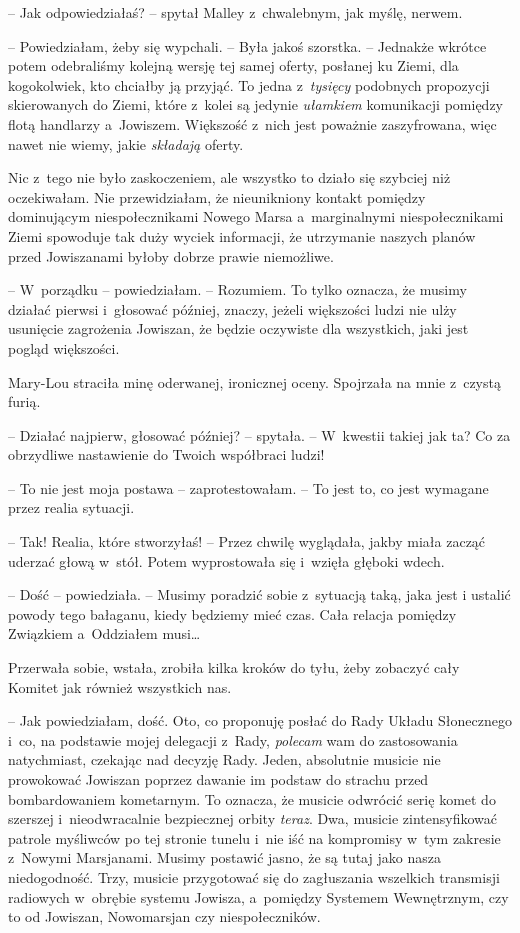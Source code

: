 \documentclass[oneside,polish,11pt,sfheadings]{mwbk}
\begin{document}
-- Jak odpowiedziałaś? -- spytał Malley z~chwalebnym, jak myślę, nerwem.

-- Powiedziałam, żeby się wypchali. -- Była jakoś szorstka. -- Jednakże
wkrótce potem odebraliśmy kolejną wersję tej samej oferty, posłanej ku
Ziemi, dla kogokolwiek, kto chciałby ją przyjąć. To jedna z~\textit{tysięcy} podobnych propozycji skierowanych do Ziemi, które z~kolei
są jedynie \textit{ułamkiem} komunikacji pomiędzy flotą handlarzy a~Jowiszem. Większość z~nich jest poważnie zaszyfrowana, więc nawet nie
wiemy, jakie \textit{składają} oferty.

Nic z~tego nie było zaskoczeniem, ale wszystko to działo się szybciej
niż oczekiwałam. Nie przewidziałam, że nieunikniony kontakt pomiędzy
dominującym niespołecznikami Nowego Marsa a~marginalnymi
niespołecznikami Ziemi spowoduje tak duży wyciek informacji, że
utrzymanie naszych planów przed Jowiszanami byłoby dobrze prawie
niemożliwe.

-- W~porządku -- powiedziałam. -- Rozumiem. To tylko oznacza, że musimy
działać pierwsi i~głosować później, znaczy, jeżeli większości ludzi nie
ulży usunięcie zagrożenia Jowiszan, że będzie oczywiste dla wszystkich,
jaki jest pogląd większości.

Mary-Lou straciła minę oderwanej, ironicznej oceny. Spojrzała na mnie z~czystą furią.

-- Działać najpierw, głosować później? -- spytała. -- W~kwestii takiej jak
ta? Co za obrzydliwe nastawienie do Twoich współbraci ludzi!

-- To nie jest moja postawa -- zaprotestowałam. -- To jest to, co jest
wymagane przez realia sytuacji.

-- Tak! Realia, które stworzyłaś! -- Przez chwilę wyglądała, jakby miała
zacząć uderzać głową w~stół. Potem wyprostowała się i~wzięła głęboki
wdech.

-- Dość -- powiedziała. -- Musimy poradzić sobie z~sytuacją taką, jaka jest
i ustalić powody tego bałaganu, kiedy będziemy mieć czas. Cała relacja
pomiędzy Związkiem a~Oddziałem musi\ldots 

Przerwała sobie, wstała, zrobiła kilka kroków do tyłu, żeby zobaczyć
cały Komitet jak również wszystkich nas. 

-- Jak powiedziałam, dość. Oto,
co proponuję posłać do Rady Układu Słonecznego i~co, na podstawie mojej
delegacji z~Rady, \textit{polecam} wam do zastosowania natychmiast,
czekając nad decyzję Rady. Jeden, absolutnie musicie nie prowokować
Jowiszan poprzez dawanie im podstaw do strachu przed bombardowaniem
kometarnym. To oznacza, że musicie odwrócić serię komet do szerszej i~nieodwracalnie bezpiecznej orbity \textit{teraz}. Dwa, musicie
zintensyfikować patrole myśliwców po tej stronie tunelu i~nie iść na
kompromisy w~tym zakresie z~Nowymi Marsjanami. Musimy postawić jasno, że
są tutaj jako nasza niedogodność. Trzy, musicie przygotować się do
zagłuszania wszelkich transmisji radiowych w~obrębie systemu Jowisza, a~pomiędzy Systemem Wewnętrznym, czy to od Jowiszan, Nowomarsjan czy
niespołeczników.
\end{document}
